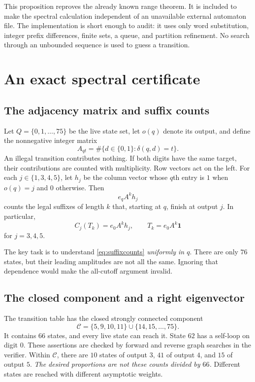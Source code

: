 \documentclass[11pt,a4paper]{article}
\theoremstyle{definition}
\theoremstyle{remark}
\newcommand{\one}{\mathbf 1}
\newcommand{\cc}{\mathcal C}
\begin{document}
This proposition reproves the already known range theorem. It is included
to make the spectral calculation independent of an unavailable external
automaton file. The implementation is short enough to audit: it uses only
word substitution, integer prefix differences, finite sets, a queue, and
partition refinement. No search through an unbounded sequence is used to
guess a transition.

\section{An exact spectral certificate}
\label{sec:spectrum}

\subsection{The adjacency matrix and suffix counts}
Let $Q=\{0,1,\ldots,75\}$ be the live state set, let $o(q)$ denote its
output, and define the nonnegative integer matrix
\begin{equation}\label{eq:A}
 A_{qt}=\#\{d\in\{0,1\}:\delta(q,d)=t\}.
\end{equation}
An illegal transition contributes nothing. If both digits have the same
target, their contributions are counted with multiplicity. Row vectors act
on the left. For each $j\in\{1,3,4,5\}$, let $h_j$ be the column vector
whose $q$th entry is $1$ when $o(q)=j$ and $0$ otherwise. Then
\begin{equation}\label{eq:suffixcounts}
 e_qA^kh_j
\end{equation}
counts the legal suffixes of length $k$ that, starting at $q$, finish at
output $j$. In particular,
\begin{equation}\label{eq:cutoffcounts}
 C_j(T_k)=e_0A^kh_j,\qquad T_k=e_0A^k\one
\end{equation}
for $j=3,4,5$.

The key task is to understand \eqref{eq:suffixcounts} \emph{uniformly in
$q$}. There are only $76$ states, but their leading amplitudes are not all
the same. Ignoring that dependence would make the all-cutoff argument
invalid.

\subsection{The closed component and a right eigenvector}
The transition table has the closed strongly connected component
\begin{equation}\label{eq:C}
 \cc=\{5,9,10,11\}\cup\{14,15,\ldots,75\}.
\end{equation}
It contains $66$ states, and every live state can reach it. State $62$ has
a self-loop on digit $0$. These assertions are checked by forward and
reverse graph searches in the verifier. Within $\cc$, there are $10$ states
of output $3$, $41$ of output $4$, and $15$ of output $5$.
\emph{The desired proportions are not these counts divided by $66$.}
Different states are reached with different asymptotic weights.
\end{document}
